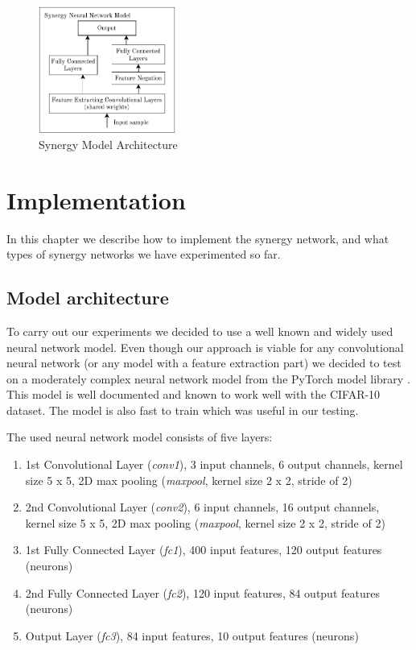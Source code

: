 \documentclass[b5paper]{book}
\let\cite\parencite
\begin{document}
\begin{figure}
\centering
  \includegraphics[width=0.4\textwidth]{figures/fig1.pdf}
\caption{Synergy Model Architecture}
\label{fig:1}       %
\end{figure}

\chapter{Implementation}

In this chapter we describe how to implement the synergy network, and what types of synergy networks we have experimented so far.

\section{Model architecture}
\label{modelarch}

To carry out our experiments we decided to use a well known and widely used neural network model. Even though our approach is viable for any convolutional neural network (or any model with a feature extraction part) we decided to test on a moderately complex neural network model from the PyTorch model library \cite{paszke2017automatic,paszke2017pytorch}. This model is well documented and known to work well with the CIFAR-10 dataset. The model is also fast to train which was useful in our testing. 

The used neural network model consists of five layers:

\begin{enumerate}
    \item 1st Convolutional Layer (\emph{conv1}), 3 input channels, 6 output channels, kernel size 5 x 5, 2D max pooling (\emph{maxpool}, kernel size 2 x 2, stride of 2)
    \item 2nd Convolutional Layer (\emph{conv2}), 6 input channels, 16 output channels, kernel size 5 x 5, 2D max pooling (\emph{maxpool}, kernel size 2 x 2, stride of 2)
    \item 1st Fully Connected Layer (\emph{fc1}), 400 input features, 120 output features (neurons)
    \item 2nd Fully Connected Layer (\emph{fc2}), 120 input features, 84 output features (neurons)
    \item Output Layer (\emph{fc3}), 84 input features, 10 output features (neurons)
\end{enumerate}
\end{document}

